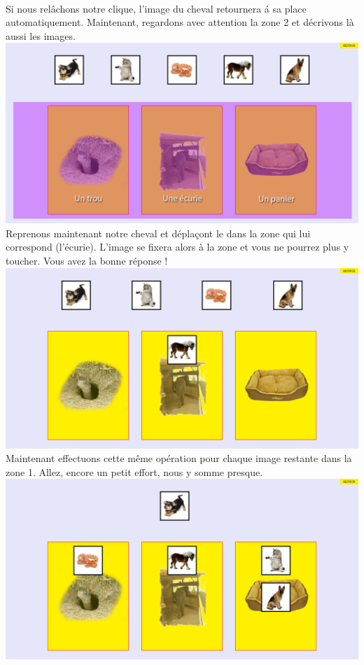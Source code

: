 \documentclass{article}
\begin{document}
\vspace{0.5cm}\\
Si nous rel\^achons notre clique, l'image du cheval retournera \'a sa place automatiquement. Maintenant, regardons avec attention la zone 2 et d\'ecrivons l\`a aussi les images. 
\vspace{0.5cm}\\
\includegraphics[width=1.0\textwidth]{zone3}
\vspace{0.5cm}\\
Reprenons maintenant notre cheval et d\'epla\c{c}ont le dans la zone qui lui correspond (l'écurie). L'image se fixera alors \`a la zone et vous ne pourrez plus y toucher. Vous avez la bonne r\'eponse !
\vspace{0.5cm}\\
\includegraphics[width=1.0\textwidth]{zone4}
\vspace{0.5cm}\\
Maintenant effectuons cette m\^eme op\'eration pour chaque image restante dans la zone 1. Allez, encore un petit effort, nous y somme presque.
\vspace{0.5cm}\\
\includegraphics[width=1.0\textwidth]{zone5}
\end{document}

